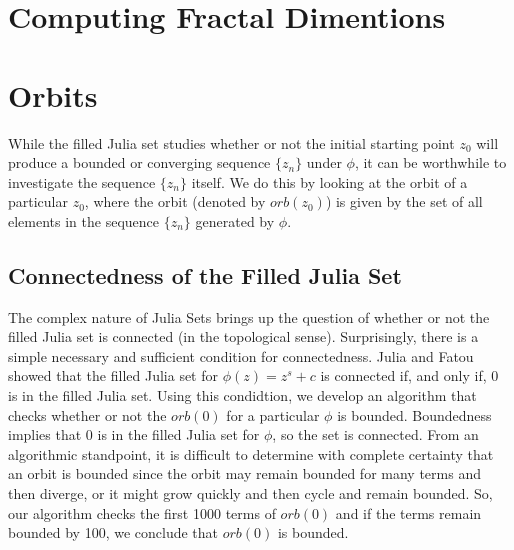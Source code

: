 \documentclass[12pt]{article}
\begin{document}
\section{Computing Fractal Dimentions}

\section{Orbits}

While the filled Julia set studies whether or not the initial starting point $z_0$ will produce a bounded or converging sequence $\{z_n\}$ under $\phi$, it can be worthwhile to investigate the sequence $\{z_n\}$ itself. We do this by looking at the orbit of a particular $z_0$, where the orbit (denoted by $orb(z_0)$) is given by the set of all elements in the sequence $\{z_n\}$ generated by $\phi$. 
	
\subsection{Connectedness of the Filled Julia Set}
The complex nature of Julia Sets brings up the question of whether or not the filled Julia set is connected (in the topological sense). Surprisingly, there is a simple necessary and sufficient condition for connectedness. Julia and Fatou showed that the filled Julia set for $\phi(z)=z^s+c$ is connected if, and only if, $0$ is in the filled Julia set. Using this condidtion, we develop an algorithm that checks whether or not the $orb(0)$ for a particular $\phi$ is bounded. Boundedness implies that $0$ is in the filled Julia set for $\phi$, so the set is connected. From an algorithmic standpoint, it is difficult to determine with complete certainty that an orbit is bounded since the orbit may remain bounded for many terms and then diverge, or it might grow quickly and then cycle and remain bounded. So, our algorithm checks the first 1000 terms of $orb(0)$ and if the terms remain bounded by 100, we conclude that $orb(0)$ is bounded.    
\end{document}
